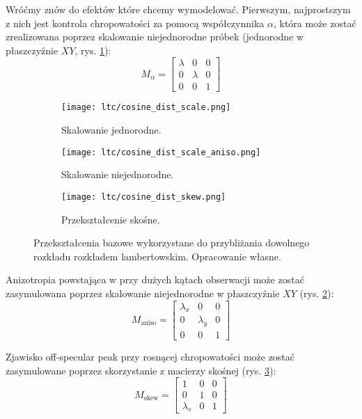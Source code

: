 \documentclass[../main.tex]{subfiles}
\begin{document}
Wróćmy znów do efektów które chcemy wymodelować. Pierwszym, najprostszym z nich jest kontrola chropowatości za pomocą
współczynnika $\alpha$, która może zostać zrealizowana poprzez skalowanie
niejednorodne próbek (jednorodne w płaszczyźnie $XY$, rys. \ref{fig:LTCEqualScale}):
\[
M_{\alpha} =
\begin{bmatrix}
  \lambda & 0 & 0 \\
  0 & \lambda & 0 \\
  0 & 0 & 1
\end{bmatrix}
\]

\begin{figure}[h]
\centering
    \begin{subfigure}[t]{0.3\textwidth}
        \texttt{[image: ltc/cosine\_dist\_scale.png]}
        \caption{Skalowanie jednorodne.}
        \label{fig:LTCEqualScale}
    \end{subfigure}
    \hspace{0.03\textwidth}
    \begin{subfigure}[t]{0.3\textwidth}
        \centering
        \texttt{[image: ltc/cosine\_dist\_scale\_aniso.png]}
        \caption{Skalowanie niejednorodne.}
        \label{fig:LTCAnisoScale}
    \end{subfigure}
    \hspace{0.03\textwidth}
    \begin{subfigure}[t]{0.3\textwidth}
        \centering
        \texttt{[image: ltc/cosine\_dist\_skew.png]}
        \caption{Przekształcenie skośne.}
        \label{fig:LTCSkew}
    \end{subfigure}
    \caption{Przekształcenia bazowe wykorzystane do przybliżania dowolnego rozkładu rozkładem lambertowskim. Opracowanie własne.}
    \label{fig:LTCTransforms}
\end{figure}

Anizotropia powstająca w przy dużych kątach obserwacji może zostać zasymulowana poprzez skalowanie niejednorodne w płaszczyźnie $XY$ (rys. \ref{fig:LTCAnisoScale}):
\[
M_{\text{aniso}} =
\begin{bmatrix}
  \lambda_x & 0 & 0 \\
  0 & \lambda_y & 0 \\
  0 & 0 & 1
\end{bmatrix}
\]



Zjawisko off-specular peak przy rosnącej chropowatości może zostać zasymulowane poprzez skorzystanie z macierzy skośnej (rys. \ref{fig:LTCSkew}):
\[
M_{\text{skew}} =
\begin{bmatrix}
  1 & 0 & 0 \\
  0 & 1 & 0 \\
  \lambda_{s} & 0 & 1
\end{bmatrix}
\]
\end{document}
